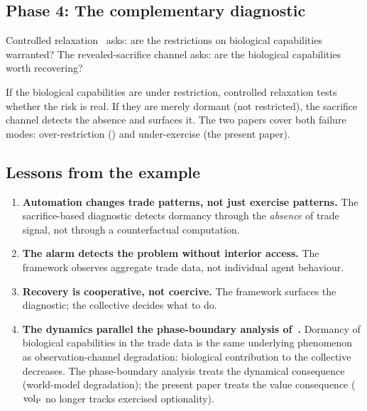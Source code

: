 \subsection{Phase 4: The complementary diagnostic}

Controlled relaxation~\citep{lasser2026wamura} asks: are the
restrictions on biological capabilities warranted?  The
revealed-sacrifice channel asks: are the biological capabilities
worth recovering?

If the biological capabilities are under restriction, controlled
relaxation tests whether the risk is real.  If they are merely
dormant (not restricted), the sacrifice channel detects the
absence and surfaces it.  The two papers cover both failure modes:
over-restriction
(\citealp{lasser2026wamura}) and
under-exercise (the present paper).

\subsection{Lessons from the example}

\begin{enumerate}
\item \textbf{Automation changes trade patterns, not just exercise
  patterns.}  The sacrifice-based diagnostic detects dormancy
  through the \emph{absence} of trade signal, not through a
  counterfactual computation.
\item \textbf{The alarm detects the problem without interior
  access.}  The framework observes aggregate trade data, not
  individual agent behaviour.
\item \textbf{Recovery is cooperative, not coercive.}  The
  framework surfaces the diagnostic; the collective decides what
  to do.
\item \textbf{The dynamics parallel the phase-boundary analysis
  of~\citep{lasser2026phase}.}  Dormancy of biological
  capabilities in the trade data is the same underlying phenomenon
  as observation-channel degradation: biological contribution to
  the collective decreases.  The phase-boundary analysis treats
  the dynamical consequence (world-model degradation); the present
  paper treats the value consequence (${\operatorname{vol}_{\mathrm{P}}}$ no longer tracks
  exercised optionality).
\end{enumerate}
